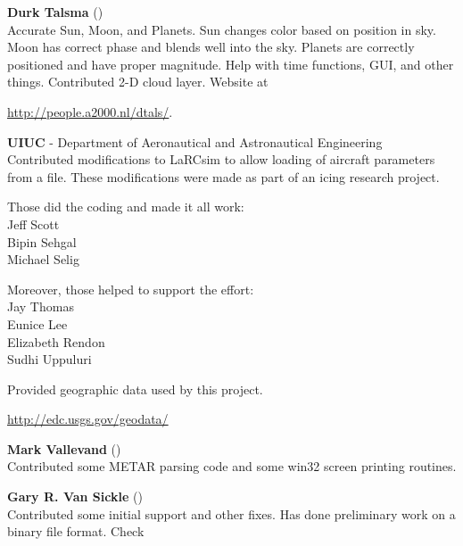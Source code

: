 \noindent \textbf{Durk Talsma} ()\\
  Accurate Sun, Moon, and Planets.  Sun changes color based on
  position in sky. Moon has correct phase and blends well into the
  sky.  Planets are correctly positioned and have proper magnitude. Help with time
  functions, GUI, and other things. Contributed 2-D cloud layer. Website
  at
   \medskip

 \href{http://people.a2000.nl/dtals/}{http://people.a2000.nl/dtals/}.
 \medskip

\noindent \textbf{UIUC} - Department of Aeronautical and Astronautical
Engineering\\
  Contributed modifications to LaRCsim to allow loading of aircraft
  parameters from a file.  These modifications were made as part of an
  icing research project.
  \medskip

  Those did the coding and made it all work:\\
      Jeff Scott \\
      Bipin Sehgal \\
      Michael Selig 
  \medskip

  Moreover, those helped to support the effort:\\
      Jay Thomas \\
      Eunice Lee \\
      Elizabeth Rendon \\
      Sudhi Uppuluri 
  \medskip


\noindent
 \textbf{}
  \medskip

  Provided geographic data used by this project.
 \medskip

\href{http://edc.usgs.gov/geodata/}{http://edc.usgs.gov/geodata/}
 \medskip

\noindent \textbf{Mark Vallevand}
()\\
  Contributed some METAR parsing code and some win32 screen printing routines.
\medskip

\noindent \textbf{Gary R. Van Sickle}
()\\
  Contributed some initial  support and other fixes. Has done
  preliminary work on a binary file format. Check
  \medskip

